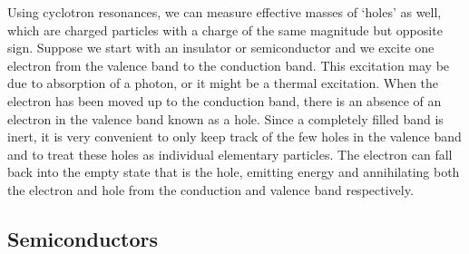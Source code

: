 \documentclass[a4paper]{article}
\begin{document}
\begin{Note}
Using cyclotron resonances, we can measure effective masses of `holes' as well, which are charged particles with a charge of the same magnitude but opposite sign. Suppose we start with an insulator or semiconductor and we excite one electron from the valence band to the conduction band. This excitation may be due to absorption of a photon, or it might be a thermal excitation. When the electron has been moved up to the conduction band, there is an absence of an electron in the valence band known as a hole. Since a completely filled band is inert, it is very convenient to only keep track of the few holes in the valence band and to treat these holes as individual elementary particles. The electron can fall back into the empty state that is the hole, emitting energy and annihilating both the electron and hole from the conduction and valence band respectively. 
\end{Note}
\newpage
\subsection{Semiconductors~\cite{simon2013oxford,singleton2001band}}
\end{document}
